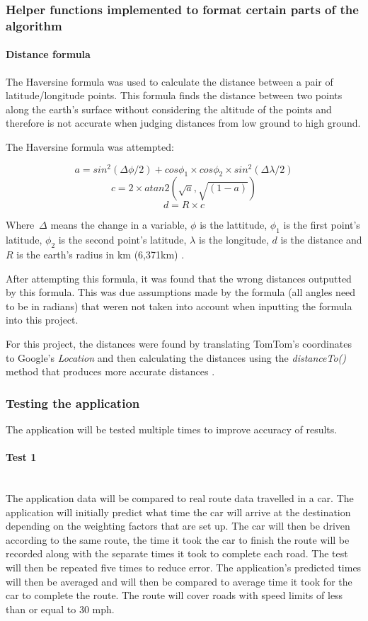 \documentclass[12pt,a4paper]{article}
\newcommand{\myparagraph}[1]{\paragraph{#1}\mbox{}\\}
\begin{document}
\subsubsection{Helper functions implemented to format certain parts of the algorithm}

\paragraph{Distance formula}
The Haversine formula was used to calculate the distance between a pair of latitude/longitude points. This formula finds the distance between two points along the earth's surface without considering the altitude of the points and therefore is not accurate when judging distances from low ground to high ground. 

The Haversine formula was attempted\cite{Haversine}: 

\[
    a= sin^2(\Delta\phi/2) + cos\phi_1 \times cos\phi_2 \times sin^2(\Delta\lambda/2)
\]
\[
    c=2 \times atan2(\sqrt{a},\sqrt{(1-a)})
    \]
\[
    d= R \times c
\]

  Where~$\Delta$ means the change in a variable, $\phi$ is the lattitude, $\phi_1$ is the first point's latitude, $\phi_2$ is the second point's latitude, $\lambda$ is the longitude, $d$ is the distance and $R$ is the earth's radius in km (6,371km) \cite{Haversine}.

  After attempting this formula, it was found that the wrong distances outputted by this formula. This was due assumptions made by the formula (all angles need to be in radians) that weren not taken into account when inputting the formula into this project.

  For this project, the distances were found by translating TomTom's coordinates to Google's \textit{Location} and then calculating the distances using the \textit{distanceTo()} method that produces more accurate distances \cite{GoogleLocation}.

\subsubsection{Testing the application}
The application will be tested multiple times to improve accuracy of results. 

\myparagraph{Test 1}
The application data will be compared to real route data travelled in a car. The application will initially predict what time the car will arrive at the destination depending on the weighting factors that are set up. The car will then be driven according to the same route, the time it took the car to finish the route will be recorded along with the separate times it took to complete each road. The test will then be repeated five times to reduce error. The application's predicted times will then be averaged and will then be compared to average time it took for the car to complete the route. The route will cover roads with speed limits of less than or equal to 30 mph.
\end{document}
